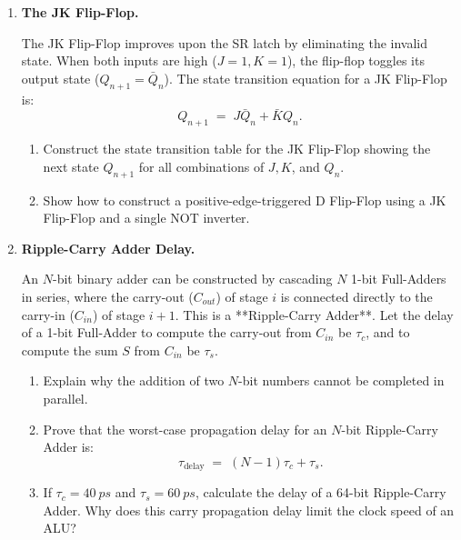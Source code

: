 \documentclass[12pt, a4paper]{book}
\begin{document}
\begin{problembox}
\begin{enumerate}[label=\textbf{P\arabic*.}]
  \item \textbf{The JK Flip-Flop.}
  
        The JK Flip-Flop improves upon the SR latch by eliminating the invalid state. When both inputs are high ($J=1, K=1$), the flip-flop toggles its output state ($Q_{n+1} = \bar{Q}_n$).
        The state transition equation for a JK Flip-Flop is:
        \[
          Q_{n+1} \;=\; J \bar{Q}_n + \bar{K} Q_n.
        \]
        \begin{enumerate}[label=(\alph*)]
          \item Construct the state transition table for the JK Flip-Flop showing the next state $Q_{n+1}$ for all combinations of $J, K$, and $Q_n$.
          \item Show how to construct a positive-edge-triggered D Flip-Flop using a JK Flip-Flop and a single NOT inverter.
        \end{enumerate}

  \item \textbf{Ripple-Carry Adder Delay.}
  
        An $N$-bit binary adder can be constructed by cascading $N$ 1-bit Full-Adders in series, where the carry-out ($C_{out}$) of stage $i$ is connected directly to the carry-in ($C_{in}$) of stage $i+1$. This is a **Ripple-Carry Adder**.
        Let the delay of a 1-bit Full-Adder to compute the carry-out from $C_{in}$ be $\tau_c$, and to compute the sum $S$ from $C_{in}$ be $\tau_s$.
        \begin{enumerate}[label=(\alph*)]
          \item Explain why the addition of two $N$-bit numbers cannot be completed in parallel.
          \item Prove that the worst-case propagation delay for an $N$-bit Ripple-Carry Adder is:
                \[
                  \tau_{\text{delay}} \;=\; (N-1) \tau_c + \tau_s.
                \]
          \item If $\tau_c = \SI{40}{ps}$ and $\tau_s = \SI{60}{ps}$, calculate the delay of a 64-bit Ripple-Carry Adder.
                Why does this carry propagation delay limit the clock speed of an ALU?
        \end{enumerate}
\end{enumerate}
\end{problembox}

\newpage
\end{document}
